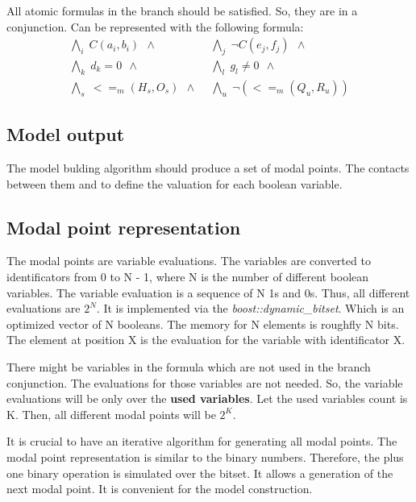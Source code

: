 \documentclass{article}
\begin{document}
	All atomic formulas in the branch should be satisfied. So, they are in a conjunction. Can be represented with the following formula:
	\begin{align*}
		\bigwedge\nolimits_{i} \; C(a_i, b_i) \:\: \wedge \:\: &
		\bigwedge\nolimits_{j} \; \neg C(e_j, f_j) \:\: \wedge \:\: \\
		\bigwedge\nolimits_{k} \; d_k = 0 \:\: \wedge \:\: &
		\bigwedge\nolimits_{l} \; g_l \neq 0 \:\: \wedge \:\: \\
		\bigwedge\nolimits_{s} \; <=_m(H_s, O_s) \:\: \wedge \:\: &
		\bigwedge\nolimits_{u} \; \neg (<=_m(Q_u, R_u) )
	\end{align*}

	\subsection*{Model output}
	\label{tableaux:branch:output}
	The model bulding algorithm should produce a set of modal points. The contacts between them and to define the valuation for each boolean variable.

	\subsection{Modal point representation}
	The modal points are variable evaluations. The variables are converted to  identificators from 0 to N - 1, where N is the number of different boolean variables. The variable evaluation is a sequence of N 1s and 0s. Thus, all different evaluations are $2^N$. It is implemented via the \textit{boost::dynamic\_bitset}. Which is an optimized vector of N booleans. The memory for N elements is roughfly N bits. The element at position X is the evaluation for the variable with identificator X. 

	There might be variables in the formula which are not used in the branch conjunction. The evaluations for those variables are not needed. So, the variable evaluations will be only over the \textbf{used variables}. Let the used variables count is K. Then, all different modal points will be $2^K$.

	It is crucial to have an iterative algorithm for generating all modal points. The modal point representation is similar to the binary numbers. Therefore, the plus one binary operation is simulated over the bitset. It allows a generation of the next modal point. It is convenient for the model construction.
\end{document}
